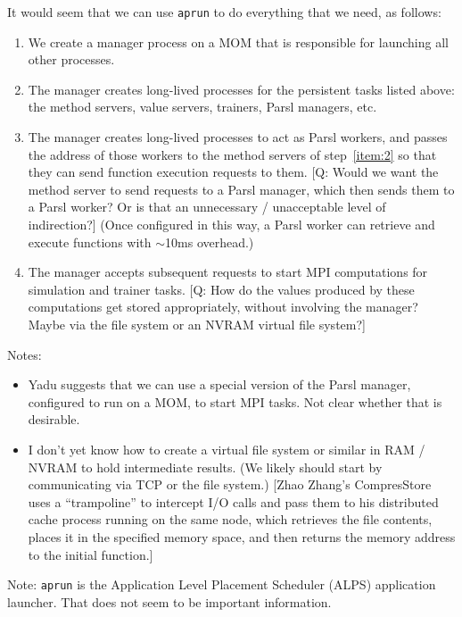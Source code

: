 \documentclass[10pt]{article}
\newcommand\q[1]{{\color{blue}[Q: #1]}}
\begin{document}
It would seem that we can use \texttt{aprun} to do everything that we need, as follows:
\begin{enumerate} 
\item 
We create a manager process on a MOM that is
responsible for launching all other processes.
\item\label{item:2}
The manager creates long-lived processes for the persistent tasks listed above:
the method servers, value servers, trainers, Parsl managers, etc. 
\item 
The manager creates long-lived processes to act as Parsl workers,
and passes the address of those workers to the method servers of step~\ref{item:2}
so that they can send function execution requests to them.
\q{Would we want the method server to send requests to a Parsl manager, which then
sends them to a Parsl worker? Or is that an unnecessary / unacceptable level of indirection?}
(Once configured in this way, a Parsl worker can retrieve and execute functions with $\sim$10ms overhead.)
\item 
The manager accepts subsequent requests to start MPI computations for simulation and trainer tasks. 
\q{How do the values produced by these computations get stored appropriately, without involving the manager? 
Maybe via the file system or an NVRAM virtual file system?}

\end{enumerate} 

\noindent
Notes:
\begin{itemize} 
\item
Yadu suggests that we can use a special version of the  Parsl manager, configured to run on a MOM, to start MPI tasks. Not clear whether that is desirable.
\item
 I don't yet know how to create a virtual file system or similar in RAM / NVRAM to hold intermediate results. (We likely should start by communicating via TCP or the file system.) [Zhao Zhang's CompresStore uses a ``trampoline'' to intercept I/O calls and pass them to his distributed cache process running on the same node, which retrieves the file contents, places it in the specified memory space, and then returns the memory address to the initial function.]
\end{itemize}

\vspace{1ex}

\noindent 
Note: \texttt{aprun} is the Application Level Placement Scheduler (ALPS) application launcher. That does not seem to be important information.
\end{document}

